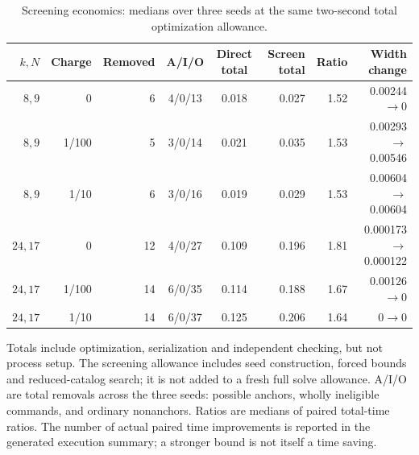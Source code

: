 \begin{table}[p]\centering\small
\caption{Screening economics: medians over three seeds at the same two-second total optimization allowance.}\label{tab:screen56}
\begin{tabular}{@{}rrrccrrr@{}}\toprule
$k,N$ & Charge & Removed & A/I/O & Direct total & Screen total & Ratio & Width change \\ \midrule
$8,9$ & 0 & 6 & 4/0/13 & 0.018 & 0.027 & 1.52 & 0.00244$\to$0 \\
$8,9$ & 1/100 & 5 & 3/0/14 & 0.021 & 0.035 & 1.53 & 0.00293$\to$0.00546 \\
$8,9$ & 1/10 & 6 & 3/0/16 & 0.019 & 0.029 & 1.53 & 0.00604$\to$0.00604 \\
$24,17$ & 0 & 12 & 4/0/27 & 0.109 & 0.196 & 1.81 & 0.000173$\to$0.000122 \\
$24,17$ & 1/100 & 14 & 6/0/35 & 0.114 & 0.188 & 1.67 & 0.00126$\to$0 \\
$24,17$ & 1/10 & 14 & 6/0/37 & 0.125 & 0.206 & 1.64 & 0$\to$0 \\
\bottomrule\end{tabular}
\par\smallskip\begin{minipage}{\textwidth}\footnotesize Totals include optimization, serialization and independent checking, but not process setup. The screening allowance includes seed construction, forced bounds and reduced-catalog search; it is not added to a fresh full solve allowance. A/I/O are total removals across the three seeds: possible anchors, wholly ineligible commands, and ordinary nonanchors. Ratios are medians of paired total-time ratios. The number of actual paired time improvements is reported in the generated execution summary; a stronger bound is not itself a time saving.\end{minipage}
\end{table}\clearpage
